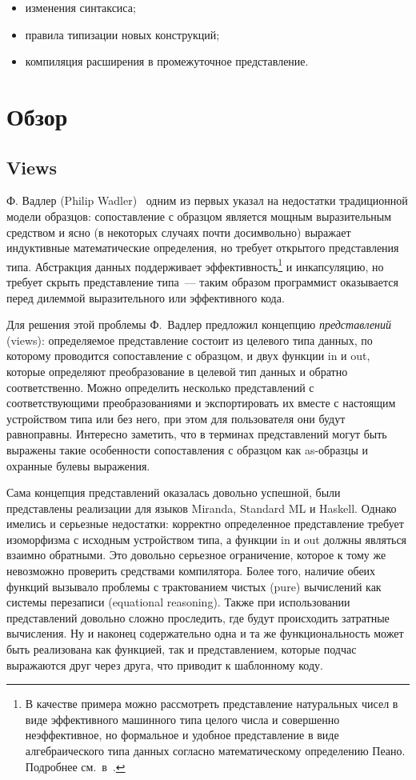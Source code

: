 \begin{itemize}
\item изменения синтаксиса;
\item правила типизации новых конструкций;
\item компиляция расширения в промежуточное представление.
\end{itemize}

\section{Обзор}

\subsection{Views}
Ф. Вадлер (Philip Wadler)~\cite{wadler1987views} одним из первых указал на недостатки традиционной модели образцов: сопоставление с образцом является мощным выразительным средством и ясно (в некоторых случаях почти досимвольно) выражает индуктивные математические определения, но требует открытого представления типа. Абстракция данных поддерживает \mbox{эффективность}\footnote{В качестве примера можно рассмотреть представление натуральных чисел в виде эффективного машинного типа целого числа и совершенно неэффективное, но формальное и удобное представление в виде алгебраического типа данных согласно математическому определению Пеано. Подробнее см.~в~\cite{wadler1987views}.} и инкапсуляцию, но требует скрыть представление типа~--- таким образом программист оказывается перед дилеммой выразительного или эффективного кода. 

Для решения этой проблемы Ф.~Вадлер предложил концепцию \textit{представлений} (views): определяемое представление состоит из целевого типа данных, по которому проводится сопоставление с образцом, и двух функции in и out, которые определяют преобразование в  целевой тип данных и обратно соответственно. Можно определить несколько представлений с соответствующими преобразованиями и экспортировать их вместе с настоящим устройством типа или без него, при этом для пользователя они будут равноправны. Интересно заметить, что в терминах представлений могут быть выражены такие особенности сопоставления с образцом как as-образцы и охранные булевы выражения.

Сама концепция представлений оказалась довольно успешной, были представлены реализации для языков Miranda, Standard ML и Haskell. Однако имелись и серьезные недостатки: корректно определенное представление требует изоморфизма с исходным устройством типа, а функции in и out должны являться взаимно обратными. Это довольно серьезное ограничение, которое к тому же невозможно проверить средствами компилятора. Более того, наличие обеих функций вызывало проблемы с трактованием чистых (pure) вычислений как системы перезаписи (equational reasoning). Также при использовании представлений довольно сложно проследить, где будут происходить затратные вычисления. Ну и наконец содержательно одна и та же функциональность может быть реализована как функцией, так и представлением, которые подчас выражаются друг через друга, что приводит к шаблонному коду.

